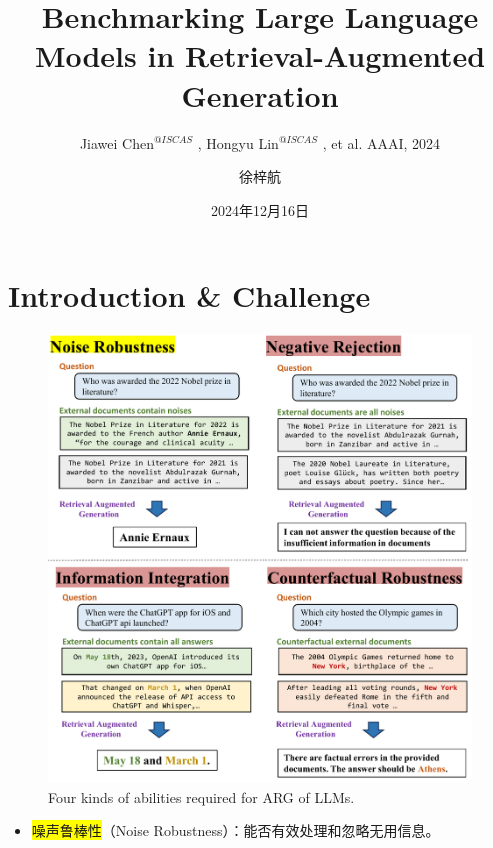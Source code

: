 \documentclass{beamer}
\author{徐梓航}
\title{Benchmarking Large Language Models in Retrieval-Augmented Generation}
\subtitle{
    \scriptsize
    Jiawei Chen\scriptsize\texorpdfstring{$^{@ISCAS}$}{\textit{@ISCAS}}
    \normalfont
    , Hongyu Lin\scriptsize\texorpdfstring{$^{@ISCAS
    }$}{\textit{@ISCAS}}
    \normalfont
    , et al. AAAI, 2024
}
\institute{华中科技大学计算机科学与技术学院}
\date{2024年12月16日}
\begin{document}
\begin{frame}
    \titlepage
    \begin{figure}[htpb]
    \end{figure}
\end{frame}

\begin{frame}
    \tableofcontents[sectionstyle=show,subsectionstyle=show/shaded/hide,subsubsectionstyle=show/shaded/hide]
\end{frame}

\section{Introduction \& Challenge}

\begin{frame}
    \begin{figure}[h]
        \centering
        \includegraphics[height=.75\textheight]{./images/figures/intro.pdf}
        \caption{Four kinds of abilities required for ARG of LLMs.}
    \end{figure}
    \begin{itemize}
        \item {\colorbox{yellow}{噪声鲁棒性}（Noise Robustness）：能否有效处理和忽略无用信息。}
    \end{itemize}
\end{frame}
\end{document}
